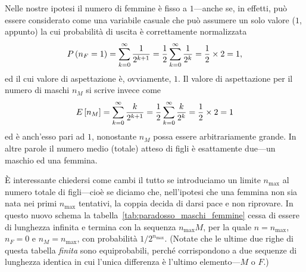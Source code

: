 Nelle nostre ipotesi il numero di femmine è fisso a $1$---anche se, in
effetti, può essere considerato come una variabile casuale che può assumere
un solo valore ($1$, appunto) la cui probabilità di uscita è correttamente
normalizzata
\begin{align*}
  \displaystyle P\left(n_F = 1\right) = \sum_{k = 0}^{\infty} \frac{1}{2^{k+1}} =
  \frac{1}{2}\sum_{k = 0}^{\infty} \frac{1}{2^k} = \frac{1}{2} \times 2 = 1,
\end{align*}
ed il cui valore di aspettazione è, ovviamente, $1$. Il valore di
aspettazione per il numero di maschi $n_M$ si scrive invece come
\begin{align}
  \displaystyle E\left[n_M\right] = \sum_{k = 0}^{\infty} \frac{k}{2^{k+1}} =
  \frac{1}{2} \sum_{k = 0}^{\infty} \frac{k}{2^k} = \frac{1}{2} \times 2 = 1
\end{align}
ed è anch'esso pari ad $1$, nonostante $n_M$ possa essere arbitrariamente
grande. In altre parole il numero medio (totale) atteso di figli è
esattamente due---un maschio ed una femmina.

\`E interessante chiedersi come cambi il tutto se introduciamo un limite
$n_\text{max}$ al numero totale di figli---cioè se diciamo che, nell'ipotesi
che una femmina non sia nata nei primi $n_\text{max}$ tentativi, la coppia decida
di darsi pace e non riprovare.
In questo nuovo schema la tabella~\ref{tab:paradosso_maschi_femmine} cessa di
essere di lunghezza infinita e termina con la sequenza $n_\text{max}M$, per la
quale $n = n_\text{max}$, $n_F = 0$ e $n_M = n_\text{max}$, con probabilità
$1/2^{n_\text{max}}$. (Notate che le ultime due righe di questa tabella
\emph{finita} sono equiprobabili, perché corrispondono a due sequenze di
lunghezza identica in cui l'unica differenza è l'ultimo elemento---$M$ o $F$.)

\begin{table}[htbp]
\end{table}

